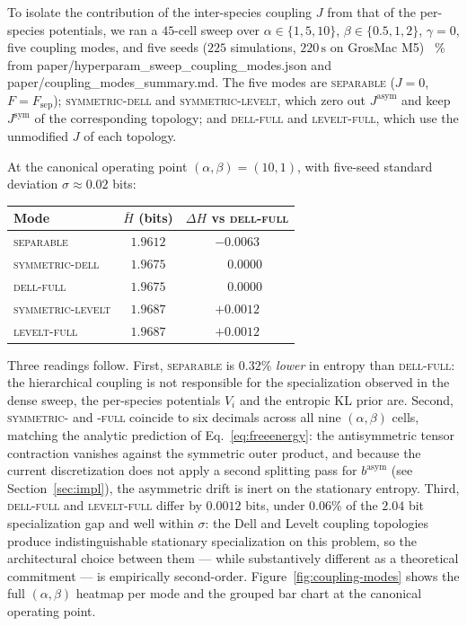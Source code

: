 \documentclass[11pt]{article}
\begin{document}
To isolate the contribution of the inter-species coupling $J$ from
that of the per-species potentials, we ran a $45$-cell sweep over
$\alpha \in \{1, 5, 10\}$, $\beta \in \{0.5, 1, 2\}$, $\gamma = 0$,
five coupling modes, and five seeds
($225$ simulations, $220\,\mathrm{s}$ on GrosMac M5)~%
{\small\% from paper/hyperparam\_sweep\_coupling\_modes.json and
paper/coupling\_modes\_summary.md}. The five modes are
\textsc{separable} ($J = 0$, $F = F_{\mathrm{sep}}$);
\textsc{symmetric-dell} and \textsc{symmetric-levelt}, which zero
out $J^{\mathrm{asym}}$ and keep $J^{\mathrm{sym}}$ of the
corresponding topology; and \textsc{dell-full} and
\textsc{levelt-full}, which use the unmodified $J$ of each topology.

At the canonical operating point $(\alpha, \beta) = (10, 1)$, with
five-seed standard deviation $\sigma \approx 0.02$ bits:
\begin{center}
\begin{tabular}{lcc}
\hline
Mode & $\bar H$ (bits) & $\Delta H$ vs \textsc{dell-full} \\
\hline
\textsc{separable}        & $1.9612$ & $-0.0063$ \\
\textsc{symmetric-dell}   & $1.9675$ & $\phantom{-}0.0000$ \\
\textsc{dell-full}        & $1.9675$ & $\phantom{-}0.0000$ \\
\textsc{symmetric-levelt} & $1.9687$ & $+0.0012$ \\
\textsc{levelt-full}      & $1.9687$ & $+0.0012$ \\
\hline
\end{tabular}
\end{center}

Three readings follow. First, \textsc{separable} is $0.32\%$
\emph{lower} in entropy than \textsc{dell-full}: the hierarchical
coupling is not responsible for the specialization observed in the
dense sweep, the per-species potentials $V_i$ and the entropic KL
prior are. Second, \textsc{symmetric-\textasteriskcentered} and
\textsc{\textasteriskcentered-full} coincide to six decimals across
all nine $(\alpha, \beta)$ cells, matching the analytic prediction of
Eq.~\eqref{eq:freeenergy}: the antisymmetric tensor contraction
vanishes against the symmetric outer product, and because the current
discretization does not apply a second splitting pass for
$b^{\mathrm{asym}}$ (see Section~\ref{sec:impl}), the asymmetric drift
is inert on the stationary entropy. Third, \textsc{dell-full} and
\textsc{levelt-full} differ by $0.0012$ bits, under $0.06\%$ of the
$2.04$ bit specialization gap and well within $\sigma$: the Dell and
Levelt coupling topologies produce indistinguishable stationary
specialization on this problem, so the architectural choice between
them --- while substantively different as a theoretical commitment ---
is empirically second-order. Figure~\ref{fig:coupling-modes} shows the
full $(\alpha, \beta)$ heatmap per mode and the grouped bar chart at
the canonical operating point.
\end{document}
